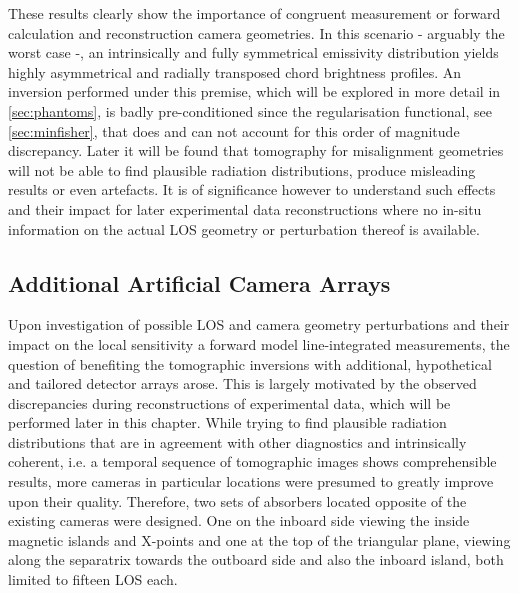             These results clearly show the importance of congruent measurement or forward calculation and reconstruction camera geometries. In this scenario - arguably the worst case -, an intrinsically and fully symmetrical emissivity distribution yields highly asymmetrical and radially transposed chord brightness profiles. An inversion performed under this premise, which will be explored in more detail in \cref{sec:phantoms}, is badly pre-conditioned since the regularisation functional, see \cref{sec:minfisher}, that does and can not account for this order of magnitude discrepancy. Later it will be found that tomography for misalignment geometries will not be able to find plausible radiation distributions, produce misleading results or even artefacts. It is of significance however to understand such effects and their impact for later experimental data reconstructions where no in-situ information on the actual LOS geometry or perturbation thereof is available.%
%
    \subsection{Additional Artificial Camera Arrays}\label{subsec:artf}%
%
        Upon investigation of possible LOS and camera geometry perturbations and their impact on the local sensitivity a forward model line-integrated measurements, the question of benefiting the tomographic inversions with additional, hypothetical and tailored detector arrays arose. This is largely motivated by the observed discrepancies during reconstructions of experimental data, which will be performed later in this chapter. While trying to find plausible radiation distributions that are in agreement with other diagnostics and intrinsically coherent, i.e. a temporal sequence of tomographic images shows comprehensible results, more cameras in particular locations were presumed to greatly improve upon their quality. Therefore, two sets of absorbers located opposite of the existing cameras were designed. One on the inboard side viewing the inside magnetic islands and X-points and one at the top of the triangular plane, viewing along the separatrix towards the outboard side and also the inboard island, both limited to fifteen LOS each.%
%
